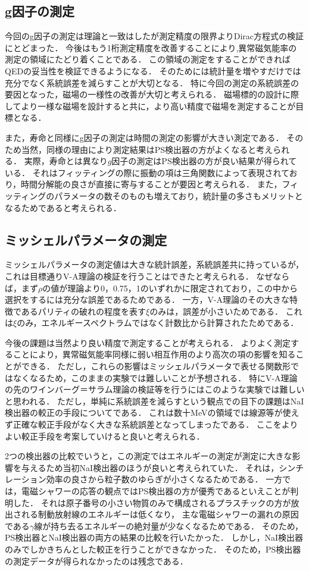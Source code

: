 \subsection{g因子の測定}
今回のg因子の測定は理論と一致はしたが測定精度の限界よりDirac方程式の検証にとどまった．
今後はもう1桁測定精度を改善することにより,異常磁気能率の測定の領域にたどり着くことである．
この領域の測定をすることができればQEDの妥当性を検証できるようになる．
そのためには統計量を増やすだけでは充分でなく系統誤差を減らすことが大切となる．
特に今回の測定の系統誤差の要因となった，磁場の一様性の改善が大切と考えられる．
磁場標的の設計に際してより一様な磁場を設計すると共に，より高い精度で磁場を測定することが目標となる．

また，寿命と同様にg因子の測定は時間の測定の影響が大きい測定である．
そのため当然，同様の理由により測定結果はPS検出器の方がよくなると考えられる．
実際，寿命とは異なり$g$因子の測定はPS検出器の方が良い結果が得られている．
それはフィッティングの際に振動の項は三角関数によって表現されており，時間分解能の良さが直接に寄与することが要因と考えられる．
また，フィッティングのパラメータの数そのものも増えており，統計量の多さもメリットとなるためであると考えられる．

\subsection{ミッシェルパラメータの測定}
ミッシェルパラメータの測定値は大きな統計誤差，系統誤差共に持っているが，これは目標通りV-A理論の検証を行うことはできたと考えられる．
なぜならば，まず$\rho$の値が理論より0，0.75，1のいずれかに限定されており，この中から選択をするには充分な誤差であるためである．
一方，V-A理論のその大きな特徴であるパリティの破れの程度を表す$\xi$のみは，誤差が小さいためである．
これは$\xi$のみ，エネルギースペクトラムではなく計数比から計算されたためである．

今後の課題は当然より良い精度で測定することが考えられる．
よりよく測定することにより，異常磁気能率同様に弱い相互作用のより高次の項の影響を知ることができる．
ただし，これらの影響はミッシェルパラメータで表せる関数形ではなくなるため，このままの実験では難しいことが予想される．
特にV-A理論の先のワインバーグ＝サラム理論の検証等を行うにはこのような実験では難しいと思われる．
ただし，単純に系統誤差を減らすという観点での目下の課題はNaI検出器の較正の手段についてである．
これは数十MeVの領域では線源等が使えず正確な較正手段がなく大きな系統誤差となってしまったである．
ここをよりよい較正手段を考案していけると良いと考えられる．

2つの検出器の比較でいうと，この測定ではエネルギーの測定が測定に大きな影響を与えるため当初NaI検出器のほうが良いと考えられていた．
それは，シンチレーション効率の良さから粒子数のゆらぎが小さくなるためである．
一方では，電磁シャワーの応答の観点ではPS検出器の方が優秀であるといえことが判明した．
それは原子番号の小さい物質のみで構成されるプラスチックの方が放出される制動放射線のエネルギーは低くなり，
主な電磁シャワーの漏れの原因である$\gamma$線が持ち去るエネルギーの絶対量が少なくなるためである．
そのため，PS検出器とNaI検出器の両方の結果の比較を行いたかった．
しかし，NaI検出器のみでしかきちんとした較正を行うことができなかった．
そのため，PS検出器の測定データが得られなかったのは残念である．


